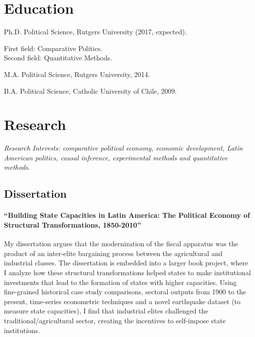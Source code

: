 \documentclass[letterpaper]{article}
\renewenvironment{itemize}{
  \begin{list}{}{
    \setlength{\leftmargin}{1.5em}
  }
}{
  \end{list}
}
\begin{document}
\section*{Education}

\begin{itemize}
  \item Ph.D. Political Science, Rutgers University (2017, expected).
  	\begin{itemize}
  		\item First field: {\small Comparative Politics}. \\ Second field: {\small Quantitative Methods}.
	\end{itemize}

  \item M.A. Political Science, Rutgers University, 2014.

  \item B.A. Political Science, Catholic University of Chile, 2009.
\end{itemize}


%


\section*{Research}

\emph{Research Interests: comparative political economy, economic development, Latin American politics, causal inference, experimental methods and quantitative methods}.

\subsection*{Dissertation}

\paragraph{``Building State Capacities in Latin America: The Political Economy of Structural Transformations, 1850-2010''} My dissertation argues that the modernization of the fiscal apparatus was the product of an inter-elite bargaining process between the agricultural and industrial classes. The dissertation is embedded into a larger book project, where I analyze how these structural transformations helped states to make institutional investments that lead to the formation of states with higher capacities. Using fine-grained historical case study comparisons, sectoral outputs from 1900 to the present, time-series econometric techniques and a novel earthquake dataset (to measure state capacities), I find that industrial elites challenged the traditional/agricultural sector, creating the incentives to self-impose state institutions.
\end{document}
